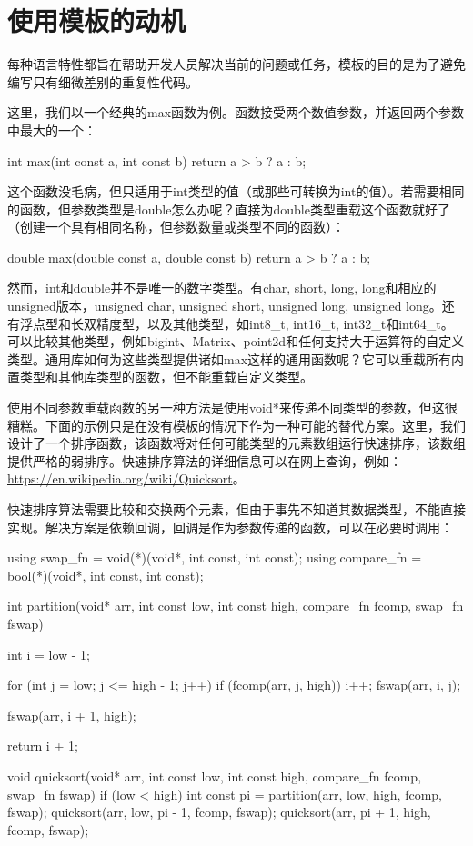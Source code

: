 \section{使用模板的动机}
每种语言特性都旨在帮助开发人员解决当前的问题或任务，模板的目的是为了避免编写只有细微差别的重复性代码。

这里，我们以一个经典的max函数为例。函数接受两个数值参数，并返回两个参数中最大的一个：

\begin{cppcode}
int max(int const a, int const b)
{
	return a > b ? a : b;
}
\end{cppcode}

这个函数没毛病，但只适用于int类型的值（或那些可转换为int的值）。若需要相同的函数，但参数类型是double怎么办呢？直接为double类型重载这个函数就好了（创建一个具有相同名称，但参数数量或类型不同的函数）：

\begin{cppcode}
double max(double const a, double const b)
{
	return a > b ? a : b;
}
\end{cppcode}

然而，int和double并不是唯一的数字类型。有char, short, long, long和相应的unsigned版本，unsigned char, unsigned short, unsigned long, unsigned long。还有浮点型和长双精度型，以及其他类型，如int8_t, int16_t, int32_t和int64_t。可以比较其他类型，例如bigint、Matrix、point2d和任何支持大于运算符的自定义类型。通用库如何为这些类型提供诸如max这样的通用函数呢？它可以重载所有内置类型和其他库类型的函数，但不能重载自定义类型。

使用不同参数重载函数的另一种方法是使用void*来传递不同类型的参数，但这很糟糕。下面的示例只是在没有模板的情况下作为一种可能的替代方案。这里，我们设计了一个排序函数，该函数将对任何可能类型的元素数组运行快速排序，该数组提供严格的弱排序。快速排序算法的详细信息可以在网上查询，例如：\url{https://en.wikipedia.org/wiki/Quicksort}。

快速排序算法需要比较和交换两个元素，但由于事先不知道其数据类型，不能直接实现。解决方案是依赖回调，回调是作为参数传递的函数，可以在必要时调用：

\begin{cppcode}
using swap_fn = void(*)(void*, int const, int const);
using compare_fn = bool(*)(void*, int const, int const);

int partition(void* arr, int const low, int const high,
			  compare_fn fcomp, swap_fn fswap)
{
	int i = low - 1;
	
	for (int j = low; j <= high - 1; j++)
	{
		if (fcomp(arr, j, high))
		{
			i++;
			fswap(arr, i, j);
		}
	}

	fswap(arr, i + 1, high);
	
	return i + 1;
}

void quicksort(void* arr, int const low, int const high,
			   compare_fn fcomp, swap_fn fswap)
{
	if (low < high)
	{
		int const pi = partition(arr, low, high, fcomp,
			fswap);
		quicksort(arr, low, pi - 1, fcomp, fswap);
		quicksort(arr, pi + 1, high, fcomp, fswap);
	}
}
\end{cppcode}

